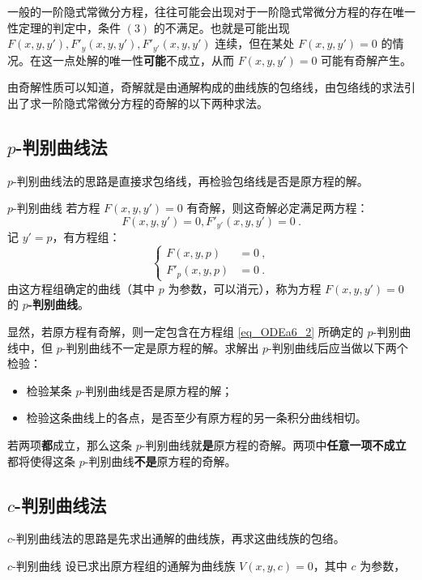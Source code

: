 
\begin{issues}
\issueDraft
\end{issues}

一般的一阶隐式常微分方程，往往可能会出现对于一阶隐式常微分方程的存在唯一性定理的判定中，条件 $(3)$ 的不满足。也就是可能出现 $F(x,y,y'), F'_y(x,y,y'), F'_{y'}(x,y,y')$ 连续，但在某处 $F(x,y,y')=0$ 的情况。在这一点处解的唯一性\textbf{可能}不成立，从而 $F(x,y,y')=0$ 可能有奇解产生。

由奇解性质可以知道，奇解就是由通解构成的曲线族的包络线，由包络线的求法引出了求一阶隐式常微分方程的奇解的以下两种求法。
\subsection{$p$-判别曲线法}\label{sub_ODEa6_1}
$p$-判别曲线法的思路是直接求包络线，再检验包络线是否是原方程的解。
\begin{definition}{$p$-判别曲线}
若方程 $F(x,y,y')=0$ 有奇解，则这奇解必定满足两方程：
\begin{equation}\label{eq_ODEa6_1}
F(x,y,y')=0, F'_{y'}(x,y,y')=0 ~.
\end{equation}
记 $y'=p$，有方程组：
\begin{equation}\label{eq_ODEa6_2}
\left \{
\begin{aligned}
F(x,y,p) &= 0~, \\
F'_{p}(x,y,p) &= 0~.
\end{aligned}
\right .
\end{equation}
由这方程组确定的曲线（其中 $p$ 为参数，可以消元），称为方程 $F(x,y,y')=0$ 的 \textbf{$p$-判别曲线}。
\end{definition}
显然，若原方程有奇解，则一定包含在方程组 \autoref{eq_ODEa6_2} 所确定的 $p$-判别曲线中，但 $p$-判别曲线不一定是原方程的解。求解出 $p$-判别曲线后应当做以下两个检验：
\begin{itemize}
\item 检验某条 $p$-判别曲线是否是原方程的解；
\item 检验这条曲线上的各点，是否至少有原方程的另一条积分曲线相切。
\end{itemize}
若两项\textbf{都}成立，那么这条 $p$-判别曲线就\textbf{是}原方程的奇解。两项中\textbf{任意一项不成立}都将使得这条 $p$-判别曲线\textbf{不是}原方程的奇解。
\subsection{$c$-判别曲线法}\label{sub_ODEa6_2}
$c$-判别曲线法的思路是先求出通解的曲线族，再求这曲线族的包络。
\begin{definition}{$c$-判别曲线}
设已求出原方程组的通解为曲线族 $V(x,y,c)=0$，其中 $c$ 为参数，
\end{definition}